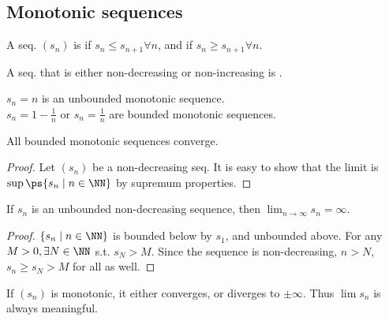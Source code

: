 \documentclass[11pt]{scrartcl}
\numberwithin{equation}{section}
\begin{document}
\subsection{Monotonic sequences}
\begin{definition}
    A seq. $(s_n)$ is  if $s_n\leq s_{n+1} \forall n$,
    and  if $s_n\geq s_{n+1} \forall n$.

    A seq. that is either non-decreasing or non-increasing is
    .
\end{definition}
\begin{example}
    $s_n=n$ is an unbounded monotonic sequence. \\
    $s_n=1-\frac{1}{n}$ or $s_n=\frac{1}{n}$ are bounded monotonic sequences.
\end{example}

\begin{theorem}
    \label{thm:bddmonotonicconv}
    All bounded monotonic sequences converge.
\end{theorem}

\begin{proof}
    Let $(s_n)$ be a non-decreasing seq.
    It is easy to show that the limit is $\sup\ps{s_n\mid n\in \NN}$
    by supremum properties.
\end{proof}

\begin{proposition}
    If $s_n$ is an unbounded non-decreasing sequence, then 
    $\lim_{n\rightarrow\infty} s_n = \infty$.
\end{proposition}
\begin{proof}
    $\left\{s_n\mid n\in\NN\right\}$ is bounded below by $s_1$,
    and unbounded above. For any $M>0, \exists N\in\NN$ s.t.
    $s_N>M$. Since the sequence is non-decreasing, 
    $n>N$, $s_n\geq s_N>M$ for all  as well.
\end{proof}
\begin{corollary}
    If $(s_n)$ is monotonic, it either converges, or diverges to $\pm\infty$.
    Thus $\lim s_n$ is always meaningful.
\end{corollary}
\end{document}

